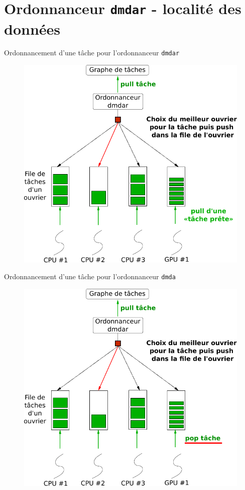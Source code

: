 \documentclass[9pt]{beamer}
\begin{document}
\section{Ordonnanceur \texttt{dmdar} - localité des données}

\begin{frame}{\textcolor{inriaGrey}{Ordonnancement d'une tâche pour l'ordonnanceur \texttt{dmdar}}}
  \begin{figure}
    \centering
    \includegraphics[width=0.7\linewidth]{img/sched_dmdar.pdf}
  \end{figure}
\end{frame}

\begin{frame}{\textcolor{inriaGrey}{Ordonnancement d'une tâche pour l'ordonnanceur \texttt{dmda}}}
  \begin{figure}
    \centering
    \includegraphics[width=0.7\linewidth]{img/sched_dmda.pdf}
  \end{figure}
\end{frame}
\end{document}
